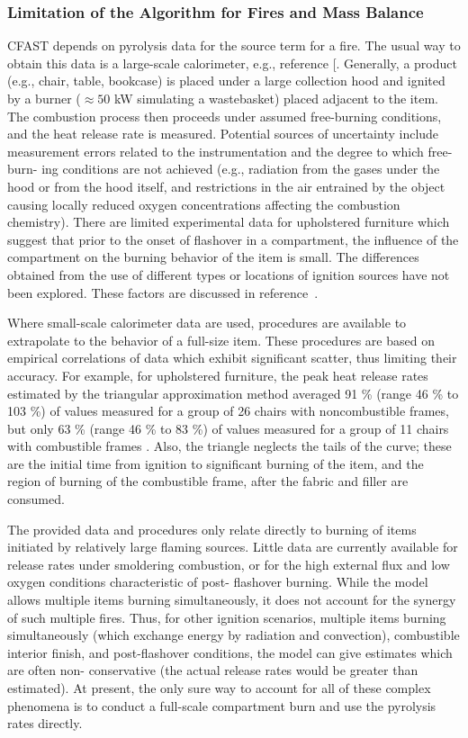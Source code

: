 \subsubsection{Limitation of the Algorithm for Fires and Mass Balance }\label{sec:firemassbalance}

CFAST depends on pyrolysis data for the source term for a fire. The usual way to obtain this
data is a large-scale calorimeter, e.g., reference [\cite{Bryant:2003}. Generally, a product (e.g., chair, table,
bookcase) is placed under a large collection hood and ignited by a burner ($\approx 50$ kW simulating a wastebasket) placed adjacent to the item.  The combustion process then proceeds under assumed
free-burning conditions, and the heat release rate is measured.  Potential sources of uncertainty
include measurement errors related to the instrumentation and the degree to which free-burn-
ing conditions are not achieved (e.g., radiation from the gases under the hood or from the hood
itself, and restrictions in the air entrained by the object causing locally reduced oxygen
concentrations affecting the combustion chemistry).  There are limited experimental data for
upholstered furniture which suggest that prior to the onset of flashover in a compartment, the
influence of the compartment on the burning behavior of the item is small.  The differences
obtained from the use of different types or locations of ignition sources have not been explored.
These factors are discussed in reference~\cite{Babrauskas:1982}.

Where small-scale calorimeter data are used, procedures are available to extrapolate to the
behavior of a full-size item.  These procedures are based on empirical correlations of data which
exhibit significant scatter, thus limiting their accuracy.  For example, for upholstered furniture,
the peak heat release rates estimated by the triangular approximation method averaged 91 \%
(range 46 \% to 103 \%) of values measured for a group of 26 chairs with noncombustible frames,
but only 63 \% (range 46 \% to 83 \%) of values measured for a group of 11 chairs with
combustible frames \cite{Babrauskas:1985}.  Also, the triangle neglects the tails of the curve; these are the initial time from ignition to significant burning of the item, and the region of burning of the combustible frame, after the fabric and filler are consumed.

The provided data and procedures only relate directly to burning of items initiated by relatively
large flaming sources.  Little data are currently available for release rates under smoldering
combustion, or for the high external flux and low oxygen conditions characteristic of post-
flashover burning.  While the model allows multiple items burning simultaneously, it does not
account for the synergy of such multiple fires.  Thus, for other ignition scenarios, multiple items
burning simultaneously (which exchange energy by radiation and convection), combustible
interior finish, and post-flashover conditions, the model can give estimates which are often non-
conservative (the actual release rates would be greater than estimated).  At present, the only sure
way to account for all of these complex phenomena is to conduct a full-scale compartment burn
and use the pyrolysis rates directly.

